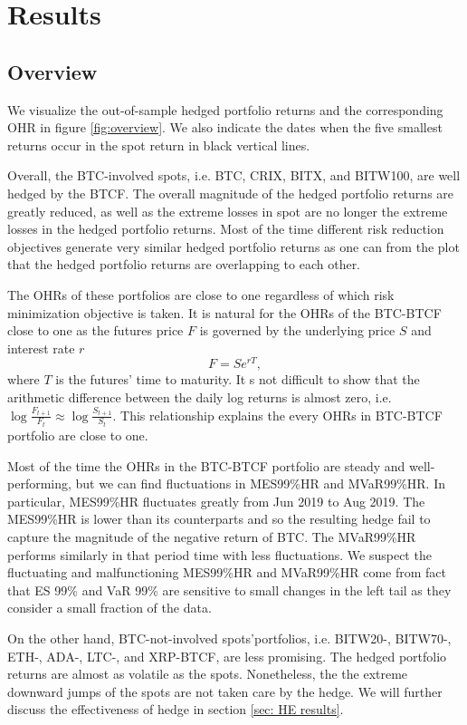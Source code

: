\section{Results}\label{sec:results}

%


\subsection{Overview}\label{sec:overview}
We visualize the out-of-sample hedged portfolio returns and the corresponding OHR in figure \ref{fig:overview}.
We also indicate the dates when the five smallest returns occur in the spot return in black vertical lines. \medskip

Overall, the BTC-involved spots, i.e. BTC, CRIX, BITX, and BITW100,  are well hedged by the BTCF.
The overall magnitude of the hedged portfolio returns are greatly reduced, as well as the extreme losses in spot are no longer the extreme losses in the hedged portfolio returns.
Most of the time different risk reduction objectives generate very similar hedged portfolio returns as one can from the plot that the hedged portfolio returns are overlapping to each other. \medskip

The OHRs of these portfolios are close to one regardless of which risk minimization objective is taken.
It is natural for the OHRs of the BTC-BTCF close to one as the futures price $F$ is governed by the underlying price $S$ and interest rate $r$
$$F = Se^{rT},$$
where $T$ is the futures' time to maturity.
It s not difficult to show that the arithmetic difference between the daily log returns is almost zero, i.e. $\log\frac{F_{t+1}}{F_t} \approx \log\frac{S_{t+1}}{S_t}$.
This relationship explains the every OHRs in BTC-BTCF portfolio are close to one. \medskip

Most of the time the OHRs in the BTC-BTCF portfolio are steady and well-performing,
but we can find fluctuations in MES99\%HR and MVaR99\%HR.
In particular, MES99\%HR fluctuates greatly from Jun 2019 to Aug 2019.
The MES99\%HR is lower than its counterparts and so the resulting hedge fail to capture the magnitude of the negative return of BTC.
The MVaR99\%HR performs similarly in that period time with less fluctuations.
We suspect the fluctuating and malfunctioning MES99\%HR and MVaR99\%HR come from fact that ES 99\% and VaR 99\% are sensitive to small changes in the left tail as they consider a small fraction
of the data. \medskip

On the other hand, BTC-not-involved spots'portfolios,  i.e. BITW20-, BITW70-, ETH-, ADA-, LTC-, and XRP-BTCF, are less promising.
The hedged portfolio returns are almost as volatile as the spots.
Nonetheless, the the extreme downward jumps of the spots are not taken care by the hedge.
We will further discuss the effectiveness of hedge in section \ref{sec: HE results}. \medskip

